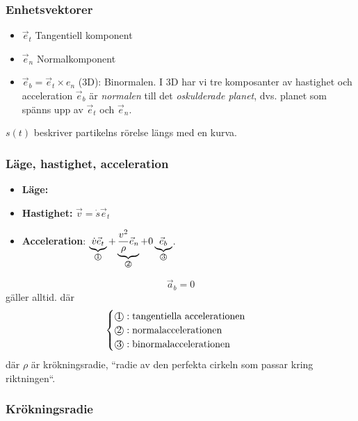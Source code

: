 \documentclass{article}
\newenvironment{ankiflashcard}[1]{}{}
\newcommand{\numbercircle}[1]{
\text{\textcircled{#1}}
}
\newcommand{\numbercirclewithunderbrace}[2]{
\underbrace{#1}_{\numbercircle{#2}}
}
\begin{document}
\begin{paracol}{2}
\subsubsection{Enhetsvektorer}
\begin{itemize}
    \item $\vec e_t$ Tangentiell komponent
    \item  $\vec e_n$ Normalkomponent
    \item $\vec e_b=\vec e_t \times e_n$ (3D): Binormalen. I 3D har vi tre komposanter av hastighet och acceleration $\vec e_b$ är \textit{normalen} till det \textit{oskulderade planet}, dvs. planet som spänns upp av $\vec e_t$ och $\vec e_n$.
\end{itemize}
$s(t)$ beskriver partikelns rörelse längs med en kurva.

\begin{ankiflashcard}{Ange ekvationer för läge, hastighet och acceleration i naturliga komponenter.}
    
\subsubsection{Läge, hastighet, acceleration}
\begin{itemize}
    \item \textbf{Läge:}
    \item \textbf{Hastighet:} $\vec v = \dot s \vec e_t$
    \item \textbf{Acceleration}: $\numbercirclewithunderbrace{\dot v \vec e_t}{1} + \numbercirclewithunderbrace{\frac{v^2}{\rho} \vec e_n}{2} + 0\numbercirclewithunderbrace{\vec e_b}{3}$. 
\end{itemize}
$$\vec a_b = 0$$ gäller alltid.
där $$\begin{cases}
    \numbercircle{1}: \text{tangentiella accelerationen}\\
    \numbercircle{2}: \text{normalaccelerationen} \\
    \numbercircle{3}: \text{binormalaccelerationen} \\
\end{cases}$$
där $\rho$ är krökningsradie, ``radie av den perfekta cirkeln som passar kring riktningen``.
\end{ankiflashcard}

\subsubsection{Krökningsradie}


\end{paracol}
\end{document}
